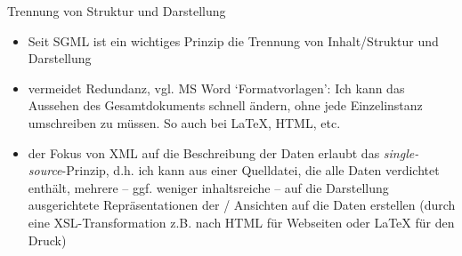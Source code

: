 \begin{frame}{Trennung von Struktur und Darstellung}

\begin{itemize}
    \item Seit SGML ist ein wichtiges Prinzip die Trennung von Inhalt/Struktur und Darstellung
    \item vermeidet Redundanz, vgl. MS Word `Formatvorlagen': Ich kann das Aussehen des Gesamtdokuments schnell ändern, ohne jede Einzelinstanz umschreiben zu müssen. So auch bei \LaTeX{}, HTML, etc.
    \item der Fokus von XML auf die Beschreibung der Daten erlaubt das \emph{single-source}-Prinzip, d.h. ich kann aus einer Quelldatei, die alle Daten verdichtet enthält, mehrere -- ggf. weniger inhaltsreiche -- auf die Darstellung ausgerichtete Repräsentationen der / Ansichten auf die Daten erstellen (durch eine XSL-Transformation z.B. nach HTML für Webseiten oder \LaTeX{} für den Druck)
\end{itemize}

\end{frame}

